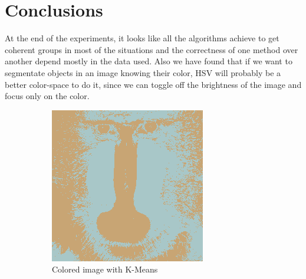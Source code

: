 \documentclass[sigconf,authorversion]{acmart}
\begin{document}
\section{Conclusions}
At the end of the experiments, it looks like all the algorithms achieve to get coherent groups in most of the situations and the correctness of one method over another depend mostly in the data used. Also we have found that if we want to segmentate objects in an image knowing their color, HSV will probably be a better color-space to do it, since we can toggle off the brightness of the image and focus only on the color.

\begin{figure}[hbtp]
  \begin{subfigure}[b]{0.25\textwidth}
      \includegraphics[width=\textwidth]{../outputs/baboon_2_hsv_colored_kmeans.png}
      \caption{Colored image with K-Means}
      \label{subfig:baboon_hsv_kmeans}
  \end{subfigure}
  \hspace{0.05\textwidth}
  \begin{subfigure}[b]{0.25\textwidth}

\end{subfigure}
\end{figure}
\end{document}

